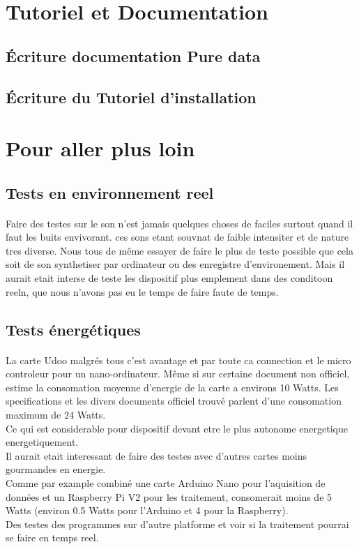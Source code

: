 \documentclass[a4paper, titlepage, oneside, 12pt]{article}%
\begin{document}
\section{Tutoriel et Documentation}
\subsection{Écriture documentation Pure data}
\subsection{Écriture du Tutoriel d'installation}

\section{Pour aller plus loin}
\subsection{Tests en environnement reel}
\paragraph{}
Faire des testes sur le son n'est jamais quelques choses de faciles surtout quand il faut les buits envivorant. ces sons etant souvnat de faible intensiter et de nature tres diverse.
Nous tous de même essayer de faire le plus de teste possible que cela soit de son synthetiser par ordinateur ou des enregistre d'environement. Mais il aurait etait interse de teste les dispositif plus emplement dans des conditoon reeln, que nous n'avons pas eu le temps de faire faute de temps. 

\subsection{Tests énergétiques}
\paragraph{}
La carte Udoo malgrés tous c'est avantage et par toute ca connection et le micro controleur pour un nano-ordinateur. Même si sur certaine document non officiel, estime la consomation moyenne d'energie de la carte a environs 10 Watts. Les specifications et les divers documents officiel trouvé parlent d'une consomation maximum de 24 Watts.\\
Ce qui est considerable pour dispositif devant etre le plus autonome energetique energetiquement.\\
Il aurait etait interessant de faire des testes avec d'autres cartes moins gourmandes en energie.\\
Comme par example combiné une carte Arduino Nano pour l'aquisition de données et un Raspberry Pi V2 pour les traitement, consomerait moins de 5 Watts (environ  0.5 Watts pour l'Arduino et 4 pour la Raspberry).\\
Des testes des programmes sur d'autre platforme et voir si la traitement pourrai se faire en temps reel.
\end{document}
